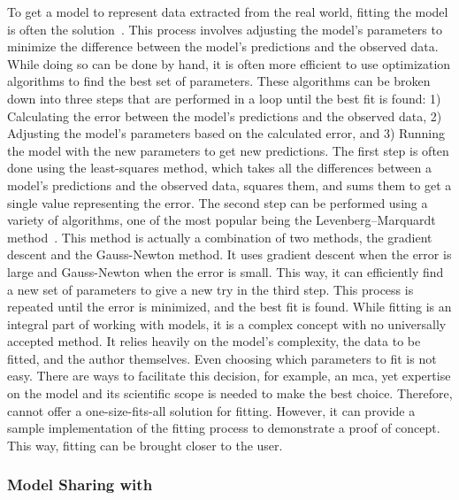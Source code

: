 To get a model to represent data extracted from the real world, fitting the model is often the solution~\cite{sebastiaoArtFittingOrdinary2022,brewerFittingOrdinaryDifferential2008}. This process involves adjusting the model's parameters to minimize the difference between the model's predictions and the observed data. While doing so can be done by hand, it is often more efficient to use optimization algorithms to find the best set of parameters. These algorithms can be broken down into three steps that are performed in a loop until the best fit is found: 1) Calculating the error between the model's predictions and the observed data, 2) Adjusting the model's parameters based on the calculated error, and 3) Running the model with the new parameters to get new predictions. The first step is often done using the least-squares method, which takes all the differences between a model's predictions and the observed data, squares them, and sums them to get a single value representing the error. The second step can be performed using a variety of algorithms, one of the most popular being the Levenberg–Marquardt method~\cite{gavinLevenbergMarquardtAlgorithmNonlinear2024}. This method is actually a combination of two methods, the gradient descent and the Gauss-Newton method. It uses gradient descent when the error is large and Gauss-Newton when the error is small. This way, it can efficiently find a new set of parameters to give a new try in the third step. This process is repeated until the error is minimized, and the best fit is found. While fitting is an integral part of working with models, it is a complex concept with no universally accepted method. It relies heavily on the model's complexity, the data to be fitted, and the author themselves. Even choosing which parameters to fit is not easy. There are ways to facilitate this decision, for example, an \gls{mca}, yet expertise on the model and its scientific scope is needed to make the best choice. Therefore, \greensloth{} cannot offer a one-size-fits-all solution for fitting. However, it can provide a sample implementation of the fitting process to demonstrate a proof of concept. This way, fitting can be brought closer to the user.

\subsubsection{Model Sharing with \greensloth{}}

